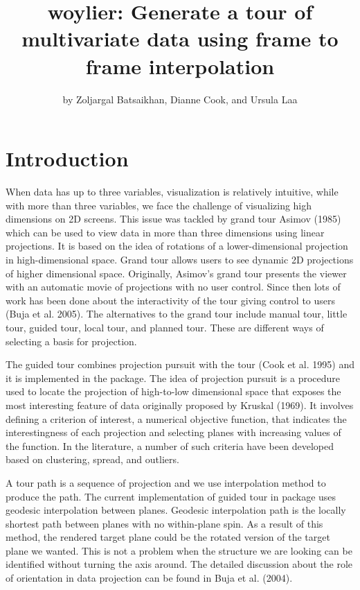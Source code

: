 \title{woylier: Generate a tour of multivariate data using frame to frame interpolation}
\author{by Zoljargal Batsaikhan, Dianne Cook, and Ursula Laa}

\maketitle


\hypertarget{introduction}{%
\section{Introduction}\label{introduction}}

When data has up to three variables, visualization is relatively intuitive, while with more than three variables, we face the challenge of visualizing high dimensions on 2D screens. This issue was tackled by grand tour Asimov (1985) which can be used to view data in more than three dimensions using linear projections. It is based on the idea of rotations of a lower-dimensional projection in high-dimensional space. Grand tour allows users to see dynamic 2D projections of higher dimensional space. Originally, Asimov's grand tour presents the viewer with an automatic movie of projections with no user control. Since then lots of work has been done about the interactivity of the tour giving control to users (Buja et al. 2005). The alternatives to the grand tour include manual tour, little tour, guided tour, local tour, and planned tour. These are different ways of selecting a basis for projection.

The guided tour combines projection pursuit with the tour (Cook et al. 1995) and it is implemented in the  package. The idea of projection pursuit is a procedure used to locate the projection of high-to-low dimensional space that exposes the most interesting feature of data originally proposed by Kruskal (1969). It involves defining a criterion of interest, a numerical objective function, that indicates the interestingness of each projection and selecting planes with increasing values of the function. In the literature, a number of such criteria have been developed based on clustering, spread, and outliers.

A tour path is a sequence of projection and we use interpolation method to produce the path. The current implementation of guided tour in  package uses geodesic interpolation between planes. Geodesic interpolation path is the locally shortest path between planes with no within-plane spin. As a result of this method, the rendered target plane could be the rotated version of the target plane we wanted. This is not a problem when the structure we are looking can be identified without turning the axis around. The detailed discussion about the role of orientation in data projection can be found in Buja et al. (2004).

